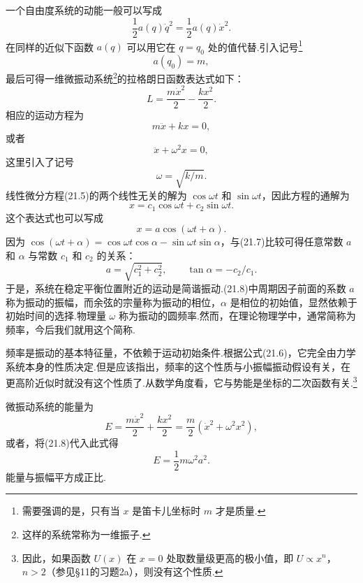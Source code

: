 一个自由度系统的动能一般可以写成
\begin{equation*}
  \frac{1}{2}a(q)\dot{q}^2=\frac{1}{2}a(q)\dot{x}^2.
\end{equation*}
在同样的近似下函数 $a(q)$ 可以用它在 $q=q_0$ 处的值代替.引入记号\footnote{需要强调的是，只有当 $x$ 是笛卡儿坐标时 $m$ 才是质量.}
\begin{equation*}
  a(q_0)=m,
\end{equation*}
最后可得一维微振动系统\footnote{这样的系统常称为一维振子.}的拉格朗日函数表达式如下：
\begin{equation}
  L=\frac{m\dot{x}^2}{2}-\frac{kx^2}{2}.
\end{equation}
相应的运动方程为
\begin{equation}
  m\ddot{x}+kx=0,
\end{equation}
或者
\begin{equation}
  \ddot{x}+\omega^2x=0,
\end{equation}
这里引入了记号
\begin{equation}
  \omega=\sqrt{k/m}.
\end{equation}
线性微分方程(21.5)的两个线性无关的解为 $\cos\omega t$ 和 $\sin\omega t$，因此方程的通解为
\begin{equation}
  x=c_1\cos\omega t+c_2\sin\omega t.
\end{equation}
这个表达式也可以写成
\begin{equation}
  x=a\cos(\omega t+\alpha).
\end{equation}
因为 $\cos(\omega t+\alpha)=\cos\omega t\cos\alpha-\sin\omega t\sin\alpha$，与(21.7)比较可得任意常数 $a$ 和 $\alpha$ 与常数 $c_1$ 和 $c_2$ 的关系：
\begin{equation}
  a=\sqrt{c_1^2+c_2^2},\qquad
  \tan\alpha=-c_2/c_1.
\end{equation}
于是，系统在稳定平衡位置附近的运动是简谐振动.(21.8)中周期因子前面的系数 $a$ 称为振动的振幅，而余弦的宗量称为振动的相位，$\alpha$ 是相位的初始值，显然依赖于初始时间的选择.物理量 $\omega$ 称为振动的圆频率.然而，在理论物理学中，通常简称为频率，今后我们就用这个简称.

频率是振动的基本特征量，不依赖于运动初始条件.根据公式(21.6)，它完全由力学系统本身的性质决定.但是应该指出，频率的这个性质与小振幅振动假设有关，在更高阶近似时就没有这个性质了.从数学角度看，它与势能是坐标的二次函数有关.\footnote{因此，如果函数 $U(x)$ 在 $x=0$ 处取数量级更高的极小值，即 $U\propto x^n$，$n>2$（参见§11的习题2a），则没有这个性质.}

微振动系统的能量为
\begin{equation*}
  E=\frac{m\dot{x}^2}{2}+\frac{kx^2}{2}
  =\frac{m}{2}\left(\dot{x}^2+\omega^2x^2\right),
\end{equation*}
或者，将(21.8)代入此式得
\begin{equation}
  E=\frac{1}{2}m\omega^2a^2.
\end{equation}
能量与振幅平方成正比.

